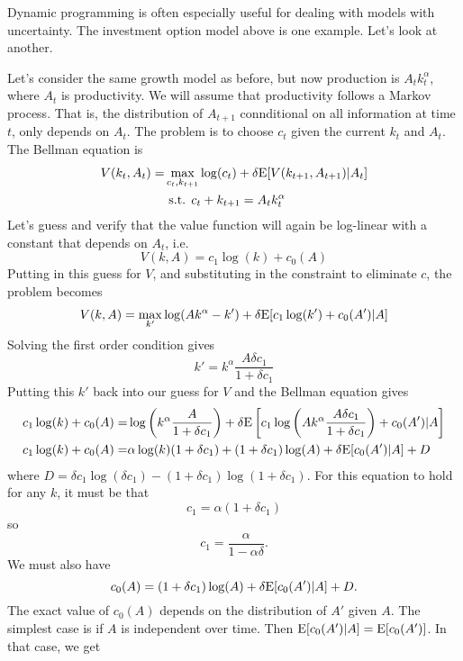 Dynamic programming is often especially useful for dealing with models
with uncertainty. The investment option model above is one
example. Let's look at another.
\begin{example}
  Let's consider the same growth model as before, but now production
  is $A_t k_t^\alpha$, where $A_t$ is productivity. We will assume
  that productivity follows a Markov process. That is, the
  distribution of $A_{t+1}$ connditional on all information at time
  $t$, only depends on $A_t$. The problem is to choose $c_t$ given the
  current $k_t$ and $A_t$. The Bellman equation is
  \begin{align*}
    V(k_t, A_t) = & \max_{c_t, k_{t+1}} \log (c_t) + \delta
                    \mathrm{E}[V(k_{t+1}, A_{t+1}) | A_t] \\
                  & \text{ s.t. } c_t + k_{t+1} = A_t k_t^\alpha 
  \end{align*}
  Let's guess and verify that the value function will again be
  log-linear with a constant that depends on $A_t$, i.e.
  \[ V(k,A) = c_1 \log(k) + c_0(A) \]
  Putting in this guess for $V$, and substituting in the constraint to
  eliminate $c$, the problem becomes
  \[ V(k,A) =  \max_{k'} \log (Ak^\alpha - k') + \delta
    \mathrm{E}[c_1\log(k') + c_0(A') | A] \]
  Solving the first order condition gives
  \[ k' = k^\alpha \frac{A \delta c_1}{1+\delta c_1} \]
  Putting this $k'$ back into our guess for $V$ and the Bellman
  equation gives
  \begin{align*}
    c_1 \log(k) + c_0(A) = & \log \left(k^\alpha \frac{A}{1+\delta
                             c_1} \right) + \delta \mathrm{E}\left[
                             c_1 \log\left(A k^\alpha \frac{A \delta
                             c_1}{1+\delta c_1}\right) + c_0(A') | A
                             \right] \\
    c_1 \log(k) + c_0(A) = & \alpha \log(k) (1+\delta c_1)  + (1+\delta c_1)\log(A)
                              + \delta \mathrm{E}[c_0(A') | A] + D
  \end{align*}
  where $D = \delta c_1 \log(\delta c_1) -(1+\delta c_1)\log(1+\delta
  c_1)$. For this equation to hold for any $k$, it must be that
  \[ c_1 = \alpha (1+\delta c_1) \]
  so
  \[ c_1 = \frac{\alpha}{1-\alpha \delta}. \]
  We must also have
  \[ c_0(A) = (1+\delta c_1)\log(A) + \delta \mathrm{E}[c_0(A') | A] + D. \]
  The exact value of $c_0(A)$ depends on the distribution of $A'$
  given $A$. The simplest case is if $A$ is independent over
  time. Then $\mathrm{E}[c_0(A')|A] = \mathrm{E}[c_0(A')]$. In that case, we get

\end{example}
